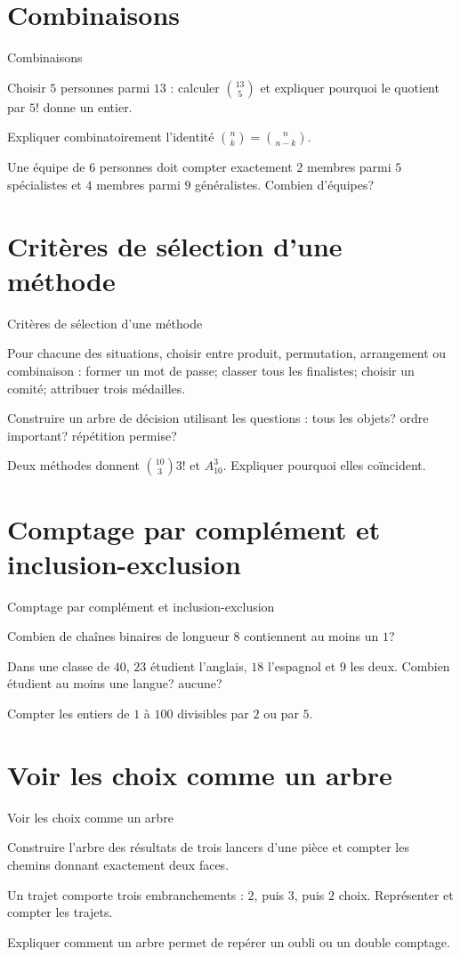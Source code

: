 \section{Combinaisons}
\label{workbook:section:07.04}
\begin{exerciseblock}{Combinaisons}
\item Choisir $5$ personnes parmi $13$ : calculer $\binom{13}{5}$ et expliquer pourquoi le quotient par $5!$ donne un entier.
\item Expliquer combinatoirement l'identité $\binom nk=\binom n{n-k}$.
\item Une équipe de $6$ personnes doit compter exactement $2$ membres parmi $5$ spécialistes et $4$ membres parmi $9$ généralistes. Combien d'équipes?
\end{exerciseblock}
\section{Critères de sélection d'une méthode}
\label{workbook:section:07.05}
\begin{exerciseblock}{Critères de sélection d'une méthode}
\item Pour chacune des situations, choisir entre produit, permutation, arrangement ou combinaison : former un mot de passe; classer tous les finalistes; choisir un comité; attribuer trois médailles.
\item Construire un arbre de décision utilisant les questions : tous les objets? ordre important? répétition permise?
\item Deux méthodes donnent $\binom{10}{3}3!$ et $A_{10}^3$. Expliquer pourquoi elles coïncident.
\end{exerciseblock}
\section{Comptage par complément et inclusion-exclusion}
\label{workbook:section:07.06}
\begin{exerciseblock}{Comptage par complément et inclusion-exclusion}
\item Combien de chaînes binaires de longueur $8$ contiennent au moins un $1$?
\item Dans une classe de $40$, $23$ étudient l'anglais, $18$ l'espagnol et $9$ les deux. Combien étudient au moins une langue? aucune?
\item Compter les entiers de $1$ à $100$ divisibles par $2$ ou par $5$.
\end{exerciseblock}
\section{Voir les choix comme un arbre}
\label{workbook:section:07.07}
\begin{exerciseblock}{Voir les choix comme un arbre}
\item Construire l'arbre des résultats de trois lancers d'une pièce et compter les chemins donnant exactement deux faces.
\item Un trajet comporte trois embranchements : $2$, puis $3$, puis $2$ choix. Représenter et compter les trajets.
\item Expliquer comment un arbre permet de repérer un oubli ou un double comptage.
\end{exerciseblock}
